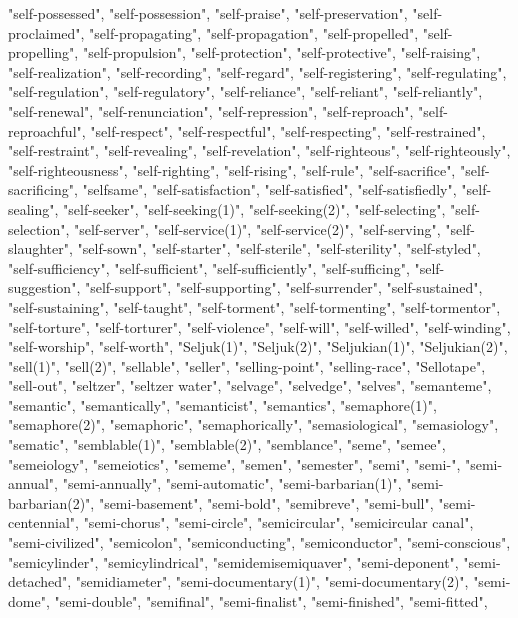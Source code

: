 "self-possessed",
"self-possession",
"self-praise",
"self-preservation",
"self-proclaimed",
"self-propagating",
"self-propagation",
"self-propelled",
"self-propelling",
"self-propulsion",
"self-protection",
"self-protective",
"self-raising",
"self-realization",
"self-recording",
"self-regard",
"self-registering",
"self-regulating",
"self-regulation",
"self-regulatory",
"self-reliance",
"self-reliant",
"self-reliantly",
"self-renewal",
"self-renunciation",
"self-repression",
"self-reproach",
"self-reproachful",
"self-respect",
"self-respectful",
"self-respecting",
"self-restrained",
"self-restraint",
"self-revealing",
"self-revelation",
"self-righteous",
"self-righteously",
"self-righteousness",
"self-righting",
"self-rising",
"self-rule",
"self-sacrifice",
"self-sacrificing",
"selfsame",
"self-satisfaction",
"self-satisfied",
"self-satisfiedly",
"self-sealing",
"self-seeker",
"self-seeking(1)",
"self-seeking(2)",
"self-selecting",
"self-selection",
"self-server",
"self-service(1)",
"self-service(2)",
"self-serving",
"self-slaughter",
"self-sown",
"self-starter",
"self-sterile",
"self-sterility",
"self-styled",
"self-sufficiency",
"self-sufficient",
"self-sufficiently",
"self-sufficing",
"self-suggestion",
"self-support",
"self-supporting",
"self-surrender",
"self-sustained",
"self-sustaining",
"self-taught",
"self-torment",
"self-tormenting",
"self-tormentor",
"self-torture",
"self-torturer",
"self-violence",
"self-will",
"self-willed",
"self-winding",
"self-worship",
"self-worth",
"Seljuk(1)",
"Seljuk(2)",
"Seljukian(1)",
"Seljukian(2)",
"sell(1)",
"sell(2)",
"sellable",
"seller",
"selling-point",
"selling-race",
"Sellotape",
"sell-out",
"seltzer",
"seltzer water",
"selvage",
"selvedge",
"selves",
"semanteme",
"semantic",
"semantically",
"semanticist",
"semantics",
"semaphore(1)",
"semaphore(2)",
"semaphoric",
"semaphorically",
"semasiological",
"semasiology",
"sematic",
"semblable(1)",
"semblable(2)",
"semblance",
"seme",
"semee",
"semeiology",
"semeiotics",
"sememe",
"semen",
"semester",
"semi",
"semi-",
"semi-annual",
"semi-annually",
"semi-automatic",
"semi-barbarian(1)",
"semi-barbarian(2)",
"semi-basement",
"semi-bold",
"semibreve",
"semi-bull",
"semi-centennial",
"semi-chorus",
"semi-circle",
"semicircular",
"semicircular canal",
"semi-civilized",
"semicolon",
"semiconducting",
"semiconductor",
"semi-conscious",
"semicylinder",
"semicylindrical",
"semidemisemiquaver",
"semi-deponent",
"semi-detached",
"semidiameter",
"semi-documentary(1)",
"semi-documentary(2)",
"semi-dome",
"semi-double",
"semifinal",
"semi-finalist",
"semi-finished",
"semi-fitted",
